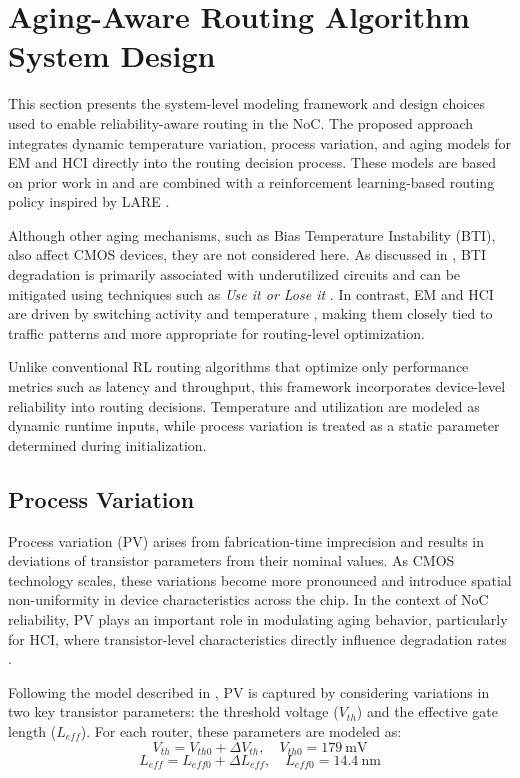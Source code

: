 \chapter{Aging-Aware Routing Algorithm System Design}

This section presents the system-level modeling framework and design choices used to enable reliability-aware routing in the NoC. The proposed approach integrates dynamic temperature variation, process variation, and aging models for EM and HCI directly into the routing decision process. These models are based on prior work in \cite{Clotho2015} and are combined with a reinforcement learning-based routing policy inspired by LARE \cite{LARE2023}.

Although other aging mechanisms, such as Bias Temperature Instability (BTI), also affect CMOS devices, they are not considered here. As discussed in \cite{Clotho2015}, BTI degradation is primarily associated with underutilized circuits and can be mitigated using techniques such as \textit{Use it or Lose it} \cite{Kim2013}. In contrast, EM and HCI are driven by switching activity and temperature \cite{Clotho2015}, making them closely tied to traffic patterns and more appropriate for routing-level optimization.

Unlike conventional RL routing algorithms that optimize only performance metrics such as latency and throughput, this framework incorporates device-level reliability into routing decisions. Temperature and utilization are modeled as dynamic runtime inputs, while process variation is treated as a static parameter determined during initialization.

\section{Process Variation}

Process variation (PV) arises from fabrication-time imprecision and results in deviations of transistor parameters from their nominal values. As CMOS technology scales, these variations become more pronounced and introduce spatial non-uniformity in device characteristics across the chip. In the context of NoC reliability, PV plays an important role in modulating aging behavior, particularly for HCI, where transistor-level characteristics directly influence degradation rates \cite{JEDEC122G}.

Following the model described in \cite{Clotho2015}, PV is captured by considering variations in two key transistor parameters: the threshold voltage ($V_{th}$) and the effective gate length ($L_{eff}$). For each router, these parameters are modeled as:
\begin{equation}
V_{th} = V_{th0} + \Delta V_{th}, \quad V_{th0} = 179\ \text{mV}
\end{equation}
\begin{equation}
L_{eff} = L_{eff0} + \Delta L_{eff}, \quad L_{eff0} = 14.4\ \text{nm}
\end{equation}

